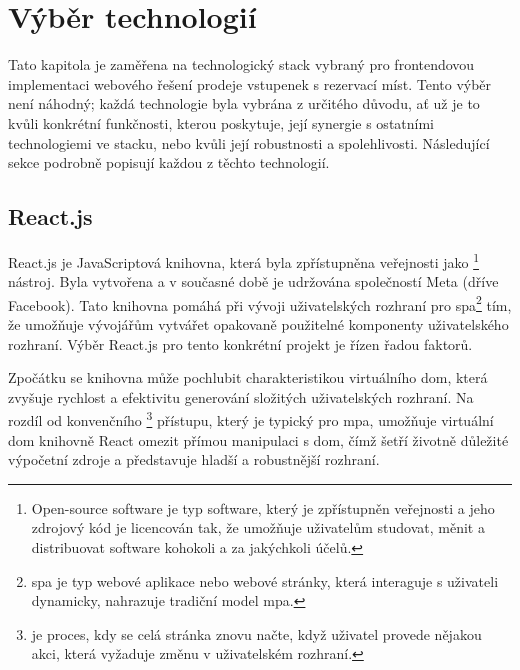 \section{Výběr technologií}
\label{sec:implementace-technologie}
Tato kapitola je zaměřena na technologický stack vybraný pro frontendovou implementaci webového řešení prodeje vstupenek s rezervací míst.
Tento výběr není náhodný; každá technologie byla vybrána z určitého důvodu, ať už je to kvůli konkrétní funkčnosti, kterou poskytuje, její synergie s ostatními technologiemi ve stacku, nebo kvůli její robustnosti a spolehlivosti.
Následující sekce podrobně popisují každou z těchto technologií.

\subsection{React.js}
\label{subsec:implementace-technologie-react}
React.js je JavaScriptová knihovna, která byla zpřístupněna veřejnosti jako \footnote{
 Open-source software je typ software, který je zpřístupněn veřejnosti a jeho zdrojový kód je licencován tak, že umožňuje uživatelům studovat, měnit a distribuovat software kohokoli a za jakýchkoli účelů\cite{rh_open_source_what_is_open_source}.
} nástroj.
Byla vytvořena a v současné době je udržována společností Meta (dříve Facebook).
Tato knihovna pomáhá při vývoji uživatelských rozhraní pro \ac{spa}\footnote{
 \ac{spa} je typ webové aplikace nebo webové stránky, která interaguje s uživateli dynamicky, nahrazuje tradiční model \ac{mpa}\cite{w_blog_spa_vs_mpa}.
} tím, že umožňuje vývojářům vytvářet opakovaně použitelné komponenty uživatelského rozhraní\cite{fos_projects_react}.
Výběr React.js pro tento konkrétní projekt je řízen řadou faktorů.

Zpočátku se knihovna může pochlubit charakteristikou virtuálního \ac{dom}, která zvyšuje rychlost a efektivitu generování složitých uživatelských rozhraní.
Na rozdíl od konvenčního \footnote{ je proces, kdy se celá stránka znovu načte, když uživatel provede nějakou akci, která vyžaduje změnu v uživatelském rozhraní.}
přístupu, který je typický pro \ac{mpa}, umožňuje virtuální \ac{dom} knihovně React omezit přímou manipulaci s \ac{dom}, čímž šetří životně důležité výpočetní zdroje a představuje hladší a robustnější rozhraní\cite{r_docs_faq_internals_what_is_the_virtual_dom}.

